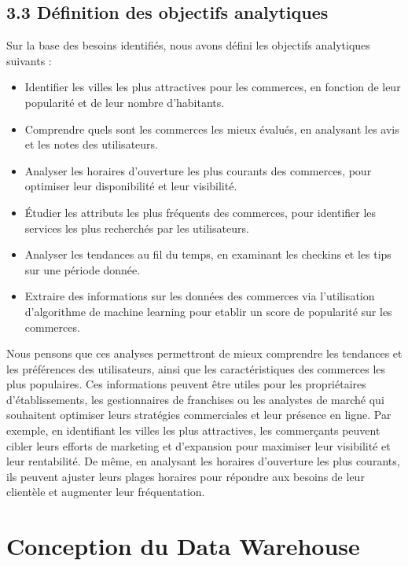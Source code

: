 \section*{3.3 Définition des objectifs analytiques}

Sur la base des besoins identifiés, nous avons défini les objectifs analytiques suivants :

\begin{itemize}
\item Identifier les villes les plus attractives pour les commerces, en fonction de leur popularité et de leur nombre d'habitants.
\item Comprendre quels sont les commerces les mieux évalués, en analysant les avis et les notes des utilisateurs.
\item Analyser les horaires d’ouverture les plus courants des commerces, pour optimiser leur disponibilité et leur visibilité.
\item Étudier les attributs les plus fréquents des commerces, pour identifier les services les plus recherchés par les utilisateurs.
\item Analyser les tendances au fil du temps, en examinant les checkins et les tips sur une période donnée.
\item Extraire des informations sur les données des commerces via l'utilisation d'algorithme de machine learning pour etablir un score de popularité sur les commerces.
\end{itemize}

Nous pensons que ces analyses permettront de mieux comprendre les tendances et les préférences des utilisateurs, ainsi que les caractéristiques des commerces les plus populaires. Ces informations peuvent être utiles pour les propriétaires d’établissements, les gestionnaires de franchises ou les analystes de marché qui souhaitent optimiser leurs stratégies commerciales et leur présence en ligne.
Par exemple, en identifiant les villes les plus attractives,
les commerçants peuvent cibler leurs efforts de marketing et d’expansion pour maximiser leur visibilité et leur rentabilité.
De même, en analysant les horaires d’ouverture les plus courants, ils peuvent ajuster leurs plages horaires pour répondre aux besoins de leur clientèle et augmenter leur fréquentation.


\chapter*{Conception du Data Warehouse}


